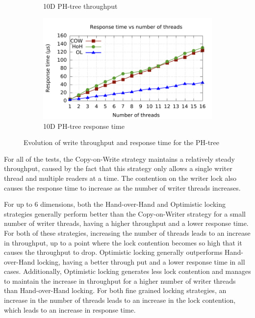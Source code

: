 \documentclass[11pt,a4paper]{globis-book}
\begin{document}
\begin{figure}
\begin{subfigure}[b]{0.5\linewidth}
        \caption{10D PH-tree throughput}
        \label{fig:exp-conc-write-10d-tp}
    \end{subfigure}%
    \begin{subfigure}[b]{0.5\linewidth}
        \includegraphics[scale=0.5]{images/plots/insert10d-rt}
        \caption{10D PH-tree response time}        
    \end{subfigure}
    \caption{Evolution of write throughput and response time for the PH-tree}
    \label{fig:concurrentd}
\end{figure}

For all of the tests, the Copy-on-Write strategy maintains a relatively steady throughput, caused by the fact that this strategy only allows a single writer thread and multiple readers at a time. The contention on the writer lock also causes the response time to increase as the number of writer threads increases.

For up to 6 dimensions, both the Hand-over-Hand and Optimistic locking strategies generally perform better than the Copy-on-Writer strategy for a small number of writer threads, having a higher throughput and a lower response time. For both of these strategies, increasing the number of threads leads to an increase in throughput, up to a point where the lock contention becomes so high that it causes the throughput to drop. Optimistic locking generally outperforms Hand-over-Hand locking, having a better through put and a lower response time in all cases. Additionally, Optimistic locking generates less lock contention and manages to maintain the increase in throughput for a higher number of writer threads than Hand-over-Hand locking. For both fine grained locking strategies, an increase in the number of threads leads to an increase in the lock contention, which leads to an increase in response time.
\end{document}
